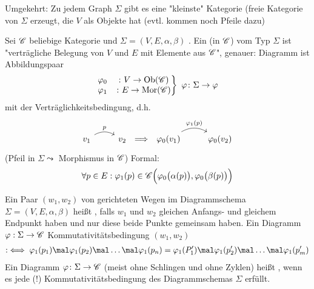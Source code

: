 Umgekehrt: Zu jedem Graph $\Sigma$ gibt es eine "kleinste" Kategorie (freie Kategorie von $\Sigma$ erzeugt, die $V$ als Objekte hat (evtl. kommen noch Pfeile dazu)
\begin{definition}\enter
	Sei $\mathscr C$ beliebige Kategorie und $\Sigma=(V,E,\alpha,\beta)$ .
	Ein  (in $\mathscr C$) vom Typ $\Sigma$ ist "verträgliche Belegung von $V$ und $E$ mit Elemente aus $\mathscr C$", genauer:
	Diagramm ist Abbildungspaar
	\begin{align*}
	\left.\begin{matrix}
		\varphi_0&\colon V\to\operatorname{Ob}(\mathscr C)\\
		\varphi_1&\colon E\to\operatorname{Mor}(\mathscr C)
	\end{matrix}\right\rbrace~\varphi\colon\Sigma\to\varphi
	\end{align*}
	mit der Verträglichkeitsbedingung, d.h.
	\begin{align*}
		\begin{tikzcd}[ampersand replacement=\&]
v_1 \arrow[r, "p", bend left] \& v_2
\end{tikzcd}\implies
	\begin{tikzcd}[ampersand replacement=\&]
\varphi_0(v_1) \arrow[r, "\varphi_1(p)", bend left] \& \varphi_0(v_2)
\end{tikzcd}
	\end{align*}
	(Pfeil in $\Sigma\leadsto$ Morphismus in $\mathscr C$)
	Formal:
	\begin{align*}
		\forall p\in E:\varphi_1(p)\in\mathscr C\Big(\varphi_0\big(\alpha(p)\big),\varphi_0\big(\beta(p)\big)\Big)
\end{align*}		
	
	Ein Paar $(w_1,w_2)$ von gerichteten Wegen im Diagrammschema $\Sigma=(V,E,\alpha,\beta)$ heißt , falls $w_1$ und $w_2$ gleichen Anfangs- und gleichem Endpunkt haben und nur diese beide Punkte gemeinsam haben.\nl
	Ein Diagramm $\varphi:\Sigma\to\mathscr C$  Kommutativitätsbedingung $(w_1,w_2)$
	\begin{align*}
		:\iff\varphi_1(p_1)\mal\varphi_1(p_2)\mal\ldots\mal\varphi_1(p_n)
		=\varphi_1(P_1')\mal\varphi_1(p_2')\mal\ldots\mal\varphi_1(p_m')
	\end{align*}
	Ein Diagramm $\varphi\colon\Sigma\to\mathscr C$ (meist ohne Schlingen und ohne Zyklen) heißt , wenn es jede (!) Kommutativitätsbedingung des Diagrammschemas $\Sigma$ erfüllt.
\end{definition}

